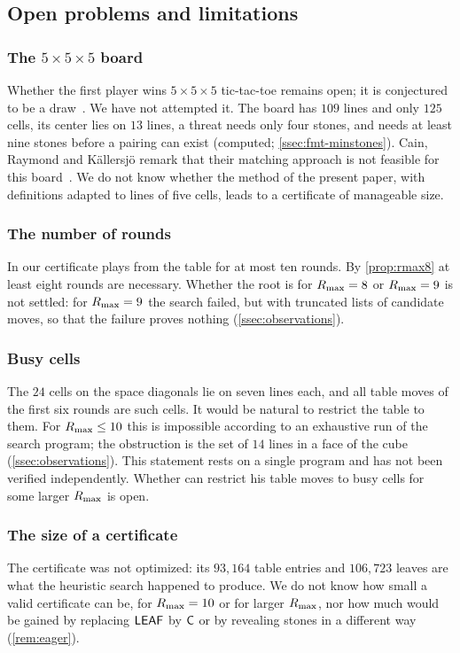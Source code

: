 \subsection{Open problems and limitations}\label{ssec:open}

\subsubsection*{The \texorpdfstring{$5\times5\times5$}{5x5x5} board}
Whether the first player wins $5\times5\times5$ tic-tac-toe remains open; it is conjectured to be a
draw~\cite{Beck2008,GolombHales2002}. We have not attempted it. The board has $109$ lines and only
$125$ cells, its center lies on $13$ lines, a threat needs only four stones, and \Breaker{} needs at
least nine stones before a pairing can exist (computed; \cref{ssec:fmt-minstones}). Cain, Raymond and
K\"allersj\"o remark that their matching approach is not feasible for this
board~\cite{CainRaymondKallersjo2025}. We do not know whether the method of the present paper,
with definitions adapted to lines of five cells, leads to a certificate of manageable size.

\subsubsection*{The number of rounds}
In our certificate \Breaker{} plays from the table for at most ten rounds. By \cref{prop:rmax8} at least
eight rounds are necessary. Whether the root is \WON{} for $R_{\max}=8$ or $R_{\max}=9$ is not settled: for
$R_{\max}=9$ the search failed, but with truncated lists of candidate moves, so that the failure proves
nothing (\cref{ssec:observations}).

\subsubsection*{Busy cells}
The $24$ cells on the space diagonals lie on seven lines each, and all table moves of the first six
rounds are such cells. It would be natural to restrict the table to them. For $R_{\max}\le 10$ this is
impossible according to an exhaustive run of the search program; the obstruction is the set of
$14$ lines in a face of the cube (\cref{ssec:observations}). This statement rests on a single program
and has not been verified independently. Whether \Breaker{} can restrict his table moves to busy cells
for some larger $R_{\max}$ is open.

\subsubsection*{The size of a certificate}
The certificate was not optimized: its $93{,}164$ table entries and $106{,}723$ leaves are what the
heuristic search happened to produce. We do not know how small a valid certificate
can be, for $R_{\max}=10$ or for larger $R_{\max}$, nor how much would be gained by replacing $\mathsf{LEAF}$ by
$\mathsf{C}$ or by revealing stones in a different way (\cref{rem:eager}).

